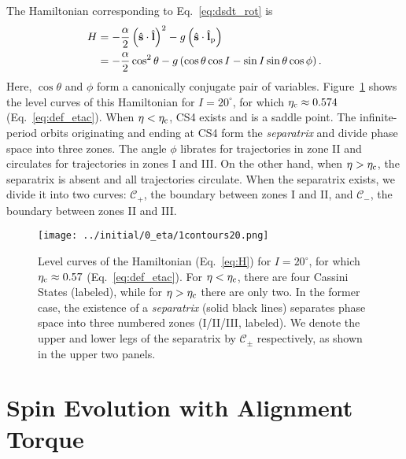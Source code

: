 \documentclass[
        fleqn,
        usenatbib,
        referee
    ]{mnras}
\newcommand*{\p}[1]{\left(#1\right)}
\newcommand*{\uv}[1]{\hat{\boldsymbol{\mathbf{#1}}}}
\newlength{\colummwidth}
\begin{document}
The Hamiltonian corresponding to Eq.~\eqref{eq:dsdt_rot} is
\begin{align}
    H &= -\frac{\alpha}{2}\p{\uv{s} \cdot \uv{l}}^2
            - g\p{\uv{s} \cdot \uv{l}_{\rm p}}\nonumber\\
        &= -\frac{\alpha}{2} \cos^2\theta
            - g\p{\cos\theta \cos I - \sin I \sin\theta \cos \phi}.\label{eq:H}
\end{align}
Here, $\cos \theta$ and $\phi$ form a canonically conjugate pair of variables.
Figure~\ref{fig:1contours} shows the level curves of this Hamiltonian for $I =
20^\circ$, for which $\eta_{\rm c} \approx 0.574$ (Eq.~\ref{eq:def_etac}). When
$\eta < \eta_{\rm c}$, CS4 exists and is a saddle point. The infinite-period
orbits originating and ending at CS4 form the \emph{separatrix} and divide phase
space into three zones. The angle $\phi$ librates for trajectories in zone II
and circulates for trajectories in zones I and III\@. On the other hand, when
$\eta > \eta_{\rm c}$, the separatrix is absent and all trajectories circulate.
When the separatrix exists, we divide it into two curves: $\mathcal{C}_+$, the
boundary between zones I and II, and $\mathcal{C}_-$, the boundary between zones
II and III\@.
\begin{figure}
    \centering
    \texttt{[image: ../initial/0\_eta/1contours20.png]}
    \caption{Level curves of the Hamiltonian (Eq.~\ref{eq:H}) for $I =
    20^\circ$, for which $\eta_{\rm c} \approx 0.57$ (Eq.~\ref{eq:def_etac}).
    For $\eta < \eta_{\rm c}$, there are four Cassini States (labeled), while
    for $\eta > \eta_{\rm c}$ there are only two. In the former case, the
    existence of a \emph{separatrix} (solid black lines) separates phase space
    into three numbered zones (I/II/III, labeled). We denote the upper and lower
    legs of the separatrix by $\mathcal{C}_{\pm}$ respectively, as shown in the
    upper two panels. }\label{fig:1contours}
\end{figure}

\section{Spin Evolution with Alignment Torque}\label{s:toy_model}
\end{document}
